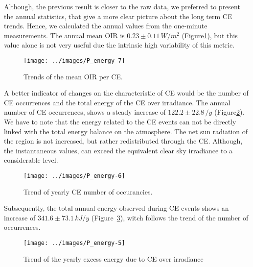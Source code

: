 \documentclass[
]{article}
\begin{document}
Although, the previous result is closer to the raw data, we preferred to present the
annual statistics, that give a more clear picture about the long term CE trends.
Hence, we calculated the annual values from the one-minute measurements. The annual
mean OIR is
\(0.23\pm 0.11\,W/m^2\)
(Figure\nobreakspace{}\ref{fig:P-energy-mean}),
but this value alone is not very useful due the intrinsic high variability of this
metric.

\begin{figure}[h!]

{\centering \texttt{[image: ../images/P\_energy-7]} 

}

\caption{Trends of the mean OIR per CE.}\label{fig:P-energy-mean}
\end{figure}

A better indicator of changes on the characteristic of CE would be the number of CE
occurrences and the total energy of the CE over irradiance. The annual number of CE
occurrences, shows a steady increase of
\(122.2\pm 22.8\,/y\)
(Figure\nobreakspace{}\ref{fig:P-energy-N}).
We have to note that the energy related to the CE events can not be directly linked
with the total energy balance on the atmosphere. The net sun radiation of the region
is not increased, but rather redistributed through the CE. Although, the
instantaneous values, can exceed the equivalent clear sky irradiance to a
considerable level.

\begin{figure}[h!]

{\centering \texttt{[image: ../images/P\_energy-6]} 

}

\caption{Trend of yearly CE number of occurancies.}\label{fig:P-energy-N}
\end{figure}

Subsequently, the total annual energy observed during CE events shows an increase of
\(341.6\pm 73.1\,kJ/y\)
(Figure~\ref{fig:P-energy-sum}), witch follows the trend of the number of
occurrences.

\begin{figure}[h!]

{\centering \texttt{[image: ../images/P\_energy-5]} 

}

\caption{Trend of the yearly excess energy due to CE over irradiance}\label{fig:P-energy-sum}
\end{figure}
\end{document}
